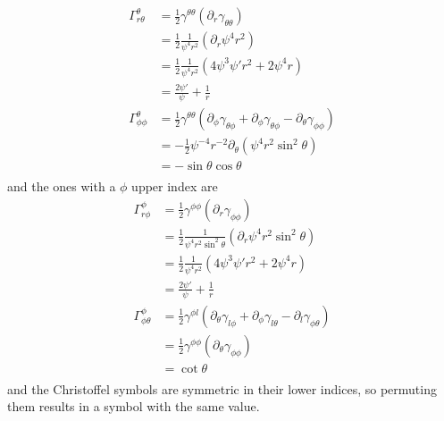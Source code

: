 \documentclass[12pt]{article}
\numberwithin{equation}{section}
\begin{document}
\begin{equation}
\begin{aligned}
\Gamma^{\theta}_{r \theta} &= \frac{1}{2} \gamma^{\theta \theta} (\partial_r \gamma_{\theta \theta}) \\
&= \frac{1}{2} \frac{1}{\psi^4 r^2} (\partial_r \psi^4 r^2) \\
&= \frac{1}{2} \frac{1}{\psi^4 r^2} (4 \psi^3 \psi' r^2 + 2 \psi^4 r) \\
&= \frac{2 \psi'}{\psi}  + \frac{1}{r} \\
\Gamma^\theta_{\phi \phi} &= \frac{1}{2} \gamma^{\theta \theta} (\partial_\phi \gamma_{\theta \phi} + \partial_\phi \gamma_{\theta \phi} - \partial_\theta \gamma_{\phi \phi}) \\
&= - \frac{1}{2} \psi^{-4} r^{-2} \partial_\theta (\psi^4 r^2 \sin^2 \theta) \\
&= - \sin \theta \cos \theta \\
\end{aligned}
\end{equation}
and the ones with a $\phi$ upper index are
\begin{equation}
\begin{aligned}
\Gamma^{\phi}_{r \phi} &= \frac{1}{2} \gamma^{\phi \phi} (\partial_r \gamma_{\phi \phi}) \\
&= \frac{1}{2} \frac{1}{\psi^4 r^2 \sin^2 \theta} (\partial_r \psi^4 r^2 \sin^2 \theta) \\
&= \frac{1}{2} \frac{1}{\psi^4 r^2} (4 \psi^3 \psi' r^2 + 2 \psi^4 r) \\
&= \frac{2 \psi'}{\psi} + \frac{1}{r} \\
\Gamma^{\phi}_{\phi \theta} &= \frac{1}{2} \gamma^{\phi l} (\partial_\theta \gamma_{l \phi} + \partial_\phi \gamma_{l \theta} - \partial_l \gamma_{\phi \theta}) \\
&= \frac{1}{2} \gamma^{\phi \phi} (\partial_\theta \gamma_{\phi \phi}) \\
&= \cot \theta \\
\end{aligned}
\end{equation}
and the Christoffel symbols are symmetric in their lower indices, so permuting them results in a symbol with the same value.
\end{document}
